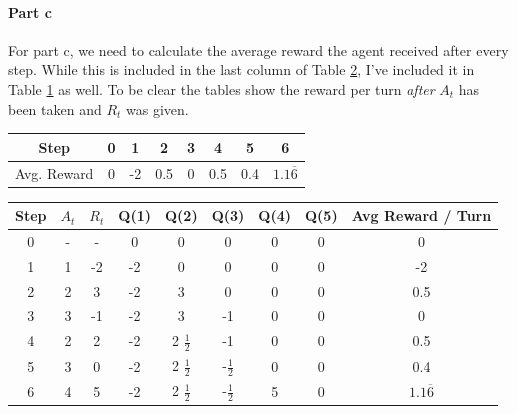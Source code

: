 \documentclass[12pt]{article}
\begin{document}
\paragraph{Part c} For part c, we need to calculate the average reward the agent received after every step. While this is included in the last column of Table \ref{tab:problem-5}, I've included it in Table \ref{tab:problem-5-avg} as well. To be clear the tables show the reward per turn \textit{after} $A_t$ has been taken and $R_t$ was given.

\begin{table}[!htb]
  \centering
  \label{tab:problem-5-avg}
  \begin{tabular}{|c|c|c|c|c|c|c|c|}
    \hline
    Step        & 0 & 1  & 2   & 3 & 4   & 5   & 6                 \\
    \hline
    Avg. Reward & 0 & -2 & 0.5 & 0 & 0.5 & 0.4 & $1.1\overline{6}$ \\
    \hline
  \end{tabular}
\end{table}


\begin{table}[!htb]
  \centering
  \label{tab:problem-5}
  \begin{tabular}{|c|c|c|ccccc|c|}
    \hline
    Step & $A_t$ & $R_t$ & Q(1) & Q(2)            & Q(3)           & Q(4) & Q(5) & Avg Reward / Turn \\ \hline
    0    & -     & -     & 0    & 0               & 0              & 0    & 0    & 0                 \\ \hline
    1    & 1     & -2    & -2   & 0               & 0              & 0    & 0    & -2                \\ \hline
    2    & 2     & 3     & -2   & 3               & 0              & 0    & 0    & 0.5               \\ \hline
    3    & 3     & -1    & -2   & 3               & -1             & 0    & 0    & 0                 \\ \hline
    4    & 2     & 2     & -2   & 2 $\frac{1}{2}$ & -1             & 0    & 0    & 0.5               \\ \hline
    5    & 3     & 0     & -2   & 2 $\frac{1}{2}$ & -$\frac{1}{2}$ & 0    & 0    & 0.4               \\ \hline
    6    & 4     & 5     & -2   & 2 $\frac{1}{2}$ & -$\frac{1}{2}$ & 5    & 0    & $1.1\overline{6}$ \\ \hline
  \end{tabular}
\end{table}
\end{document}
